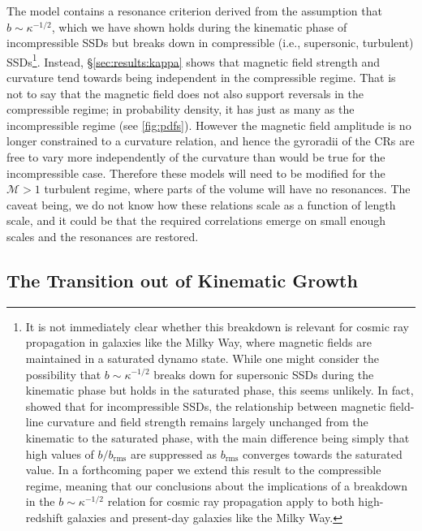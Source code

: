 \documentclass[12pt,twoside]{extreport}
\newcommand{\mSonicMach}{\ensuremath{\mathcal{M}}} %
\newcommand{\ie}{i.e.,\xspace} %
\begin{document}
The \citet{kempski2023cosmic} model contains a resonance criterion derived from the assumption that $b \sim \kappa^{-1/2}$, which we have shown holds during the kinematic phase of incompressible SSDs but breaks down in compressible (\ie supersonic, turbulent) SSDs\footnote{
    It is not immediately clear whether this breakdown is relevant for cosmic ray propagation in galaxies like the Milky Way, where magnetic fields are maintained in a saturated dynamo state. While one might consider the possibility that $b \sim \kappa^{-1/2}$ breaks down for supersonic SSDs during the kinematic phase but holds in the saturated phase, this seems unlikely. In fact, \citet{schekochihin2004simulations} showed that for incompressible SSDs, the relationship between magnetic field-line curvature and field strength remains largely unchanged from the kinematic to the saturated phase, with the main difference being simply that high values of $b/b_\mathrm{rms}$ are suppressed as $b_\mathrm{rms}$ converges towards the saturated value. In a forthcoming paper we extend this result to the compressible regime, meaning that our conclusions about the implications of a breakdown in the $b\sim\kappa^{-1/2}$ relation for cosmic ray propagation apply to both high-redshift galaxies and present-day galaxies like the Milky Way.
}. Instead, \S\ref{sec:results:kappa} shows that magnetic field strength and curvature tend towards being independent in the compressible regime. That is not to say that the magnetic field does not also support reversals in the compressible regime; in probability density, it has just as many as the incompressible regime (see \autoref{fig:pdfs}). However the magnetic field amplitude is no longer constrained to a curvature relation, and hence the gyroradii of the CRs are free to vary more independently of the curvature than would be true for the incompressible case. Therefore these models will need to be modified for the $\mSonicMach > 1$ turbulent regime, where parts of the volume will have no resonances. The caveat being, we do not know how these relations scale as a function of length scale, and it could be that the required correlations emerge on small enough scales and the resonances are restored.

\subsection{The Transition out of Kinematic Growth}
\label{sec:discussion:saturation}
\end{document}
